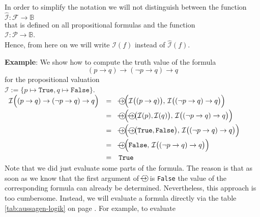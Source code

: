In order to simplify the notation we will not distinguish between the function
\\[0.2cm]
\hspace*{1.3cm}
$\widehat{\mathcal{I}}: \mathcal{F} \rightarrow \mathbb{B}$
\\[0.2cm]
that is defined on all propositional formulas and the function
\\[0.2cm]
\hspace*{1.3cm}
$\mathcal{I}: \mathcal{P} \rightarrow \mathbb{B}$.
\\[0.2cm]
Hence, from here on we will write $\mathcal{I}(f)$ instead of $\widehat{\mathcal{I}}(f)$.

\noindent
\textbf{Example}: We show how to compute the truth value of the formula
$$  (p \rightarrow q) \rightarrow (\neg p \rightarrow q) \rightarrow q $$
for the propositional valuation
\\[0.2cm]
\hspace*{1.3cm}
$\mathcal{I} := \{ p \mapsto \mathtt{True}, q \mapsto \mathtt{False} \}$.
\\[0.2cm]
\hspace*{1.3cm}
$
  \begin{array}[b]{lcl}
   \mathcal{I}\Bigl( (p \rightarrow q) \rightarrow (\neg p \rightarrow q) \rightarrow q  \Bigr) 
   & = &  \circright\Bigl( \mathcal{I}\bigl( (p \rightarrow q) \bigr),\, \mathcal{I}\bigl((\neg p \rightarrow q) \rightarrow q\bigr) \Bigr) \\[0.2cm]
   & = & \circright\Bigl( \circright\bigl( \mathcal{I}(p), \mathcal{I}(q) \bigr),\, \mathcal{I}\bigl((\neg p \rightarrow q) \rightarrow q\bigr) \Bigr) \\[0.2cm]
   & = & \circright\Bigl( \circright\bigl( \texttt{True}, \texttt{False} \bigr),\, \mathcal{I}\bigl((\neg p \rightarrow q) \rightarrow q\bigr) \Bigr) \\[0.2cm]
   & = & \circright\Bigl( \texttt{False}, \, \mathcal{I}\bigl((\neg p \rightarrow q) \rightarrow q\bigr) \Bigr) \\[0.2cm]
   & = & \texttt{True} 
  \end{array}
$ \eox
\\[0.2cm]
Note that we did just evaluate some parts of the formula.  The reason is that as soon as we know that the first
argument of $\circright$ is \texttt{False} the value of the corresponding formula can already be determined.
Nevertheless, this approach is too cumbersome.  Instead, we will evaluate a formula directly via the table
\ref{tab:aussagen-logik} on page \pageref{tab:aussagen-logik}.  For example, to evaluate

